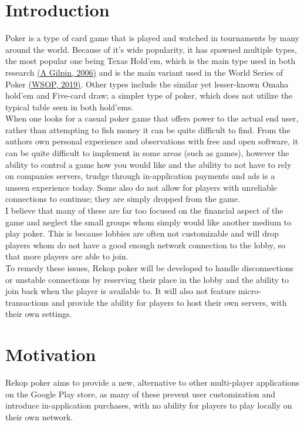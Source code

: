 \documentclass[11pt]{article}
\begin{document}
\newpage



\section{Introduction}


	
Poker is a type of card game that is played and watched in tournaments by many around the world. Because of it's wide popularity, it has spawned multiple types, the most popular one being Texas Hold'em, which is the main type used in both research \hyperlink{research_texas}{(A Gilpin, 2006)} and is the main variant used in the World Series of Poker \hyperlink{wsop_texas}{(WSOP, 2019)}. Other types include the similar yet lesser-known Omaha hold'em and Five-card draw; a simpler type of poker, which does not utilize the typical table seen in both hold'ems. \\

When one looks for a casual poker game that offers power to the actual end user, rather than attempting to fish money it can be quite difficult to find. From the authors own personal experience and observations with free and open software, it can be quite difficult to implement in some areas (such as games), however the ability to control a game how you would like and the ability to not have to rely on companies servers, trudge through in-application payments and ads is a unseen experience today. Some also do not allow for players with unreliable connections to continue; they are simply dropped from the game.  \\

I believe that many of these are far too focused on the financial aspect of the game and neglect the small groups whom simply would like another medium to play poker. This is because lobbies are often not customizable and will drop players whom do not have a good enough network connection to the lobby, so that more players are able to join.  \\

To remedy these issues, Rekop poker will be developed to handle disconnections or unstable connections by reserving their place in the lobby and the ability to join back when the player is available to. It will also not feature micro-transactions and provide the ability for players to host their own servers, with their own settings.

\section{Motivation}
Rekop poker aims to provide a new, alternative to other multi-player applications on the Google Play store, as many of these prevent user customization and introduce in-application purchases, with no ability for players to play locally on their own network. 
\end{document}
